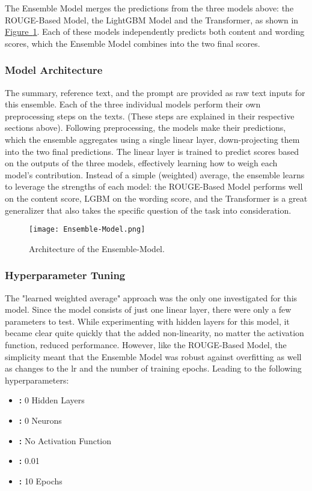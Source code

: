 The Ensemble Model merges the predictions from the three models above: the ROUGE-Based Model, the LightGBM Model and the Transformer, as shown in
\hyperref[fig:ensemble-model]{Figure~\ref{fig:ensemble-model}}.
Each of these models independently predicts both content and wording scores, which the Ensemble Model combines into the two final scores.

\subsubsection{Model Architecture}

The summary, reference text, and the prompt are provided as raw text inputs for this ensemble. Each of the three individual models perform their own preprocessing steps on the texts. (These steps are explained in their respective sections above).
Following preprocessing, the models make their predictions, which the ensemble aggregates using a single linear layer, down-projecting them into the two final predictions. The linear layer is trained to predict scores based on the outputs of the three models, effectively learning how to weigh each model's contribution. Instead of a simple (weighted) average, the ensemble learns to leverage the strengths of each model: the ROUGE-Based Model performs well on the content score, LGBM on the wording score, and the Transformer is a great generalizer that also takes the specific question of the task into consideration.

\begin{figure}[H]
\texttt{[image: Ensemble-Model.png]}
\caption{Architecture of the Ensemble-Model.}
\label{fig:ensemble-model}
\end{figure}

\subsubsection{Hyperparameter Tuning}

The "learned weighted average" approach was the only one investigated for this model. Since the model consists of just one linear layer, there were only a few parameters to test. While experimenting with hidden layers for this model, it became clear quite quickly that the added non-linearity, no matter the \gls{activation function}, reduced performance. However, like the ROUGE-Based Model, the simplicity meant that the Ensemble Model was robust against overfitting as well as changes to the \gls{lr} and the number of training \glspl{epoch}. Leading to the following hyperparameters:

\begin{itemize}
    \item \textbf{:} 0 Hidden Layers
    \item \textbf{:} 0 Neurons 
    \item \textbf{:} No Activation Function
    \item \textbf{:} 0.01
    \item \textbf{:} 10 Epochs
\end{itemize}
